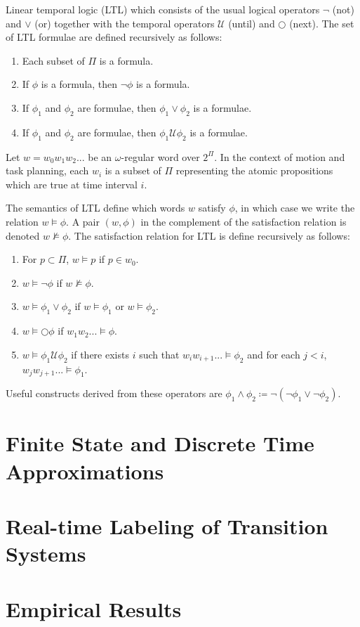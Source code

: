\documentclass{llncs}
\begin{document}
Linear temporal logic (LTL) which consists of the usual logical operators $\neg$ (not) and $\vee$ (or) together with the temporal operators $\mathcal{U}$ (until) and $\bigcirc$ (next).
%
The set of LTL formulae are defined recursively as follows:
\begin{enumerate}
	\item Each subset of $\Pi$ is a formula.
	\item If $\phi$ is a formula, then $\neg\phi$ is a formula.
	\item If $\phi_1$ and $\phi_2$ are formulae, then $\phi_1 \vee \phi_2$ is a formulae.
	\item If $\phi_1$ and $\phi_2$ are formulae, then $\phi_1 \mathcal{U} \phi_2$ is a formulae.
\end{enumerate}
Let $w=w_0w_1w_2...$ be an $\omega$-regular word over $2^{\Pi}$. 
%
In the context of motion and task planning, each $w_i$ is a subset of $\Pi$ representing the atomic propositions which are true at time interval $i$.
%

The semantics of LTL define which words $w$ satisfy $\phi$, in which case we write the relation $w \models \phi$. 
%
A pair $(w,\phi)$ in the complement of the satisfaction relation is denoted $w\not\models\phi$.
%
The satisfaction relation for LTL is define recursively as follows:
\begin{enumerate}
	\item For $p\subset \Pi$,  $w\models p$ if $p \in w_0$.
	\item $w\models \neg\phi$ if $w \not\models \phi$.
	\item $w\models \phi_1 \vee \phi_2$ if $w\models\phi_1$ or $w\models\phi_2$.
	\item $w\models \bigcirc\phi$ if $w_1w_2... \models \phi$.
	\item $w\models \phi_1 \mathcal{U} \phi_2$ if there exists $i$ such that $w_iw_{i+1}...\models\phi_2$ and for each $j<i$, $w_jw_{j+1}...\models\phi_1$.
\end{enumerate}

Useful constructs derived from these operators are $\phi_1 \wedge \phi_2 \coloneqq \neg(\neg \phi_1 \vee \neg \phi_2)$. 
%


\section{\label{sec:approach}Finite State and Discrete Time Approximations}
\section{\label{sec:Approach}Real-time Labeling of Transition Systems}
\section{\label{sec:experiments}Empirical Results}




\end{document}
